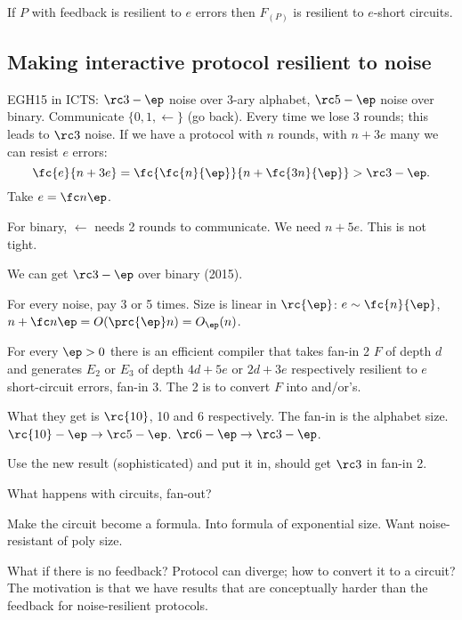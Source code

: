 If $P$ with feedback is resilient to $e$ errors then $F_{(P)}$ is resilient to $e$-short circuits.


\subsection{Making interactive protocol resilient to noise}

EGH15 in ICTS: $\rc3-\ep$ noise over 3-ary alphabet, $\rc5-\ep$ noise over binary. Communicate $\{0,1,\leftarrow\}$ (go back). Every time we lose 3 rounds; this leads to $\rc3$ noise. If we have a protocol with $n$ rounds, with $n+3e$ many we can resist $e$ errors:
\[
\fc{e}{n+3e} =\fc{\fc{n}{\ep}}{n+\fc{3n}{\ep}}>\rc 3-\ep.
\]
Take $e=\fc n{\ep}$.

For binary, $\leftarrow$ needs 2 rounds to communicate. We need $n+5e$. This is not tight.

We can get $\rc3-\ep$ over binary (2015).

For every noise, pay 3 or 5 times.
Size is linear in $\rc{\ep}$: $e\sim \fc{n}{\ep}$, $n+\fc n{\ep}=O(\prc{\ep}n)=O_\ep(n)$. 
\begin{thm}[KLR12]
For every $\ep>0$ there is an efficient compiler that takes fan-in 2 $F$ of depth $d$ and generates $E_2$ or $E_3$ of depth  $4d+5e$ or $2d+3e$ respectively resilient to $e$ short-circuit errors, fan-in 3. The 2 is to convert $F$ into and/or's.
\end{thm}
What they get is $\rc{10}$, 10 and 6 respectively.
The fan-in is the alphabet size. $\rc{10}-\ep\to \rc5-\ep$. $\rc6-\ep\to \rc3-\ep$.

Use the new result (sophisticated) and put it in, should get $\rc3$ in fan-in 2.


What happens with circuits, fan-out?

Make the circuit become a formula. Into formula of exponential size. Want noise-resistant of poly size.

What if there is no feedback? Protocol can diverge; how to convert it to a circuit? The motivation is that we have results that are conceptually harder than the feedback for noise-resilient protocols.

